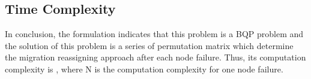 
\subsection{Time Complexity}
In conclusion, the formulation indicates that this problem is a BQP problem and the solution of this problem is a series of permutation matrix  which determine the migration reassigning approach after each node failure. Thus, its computation complexity is  , where N is the computation
complexity for one node failure.
